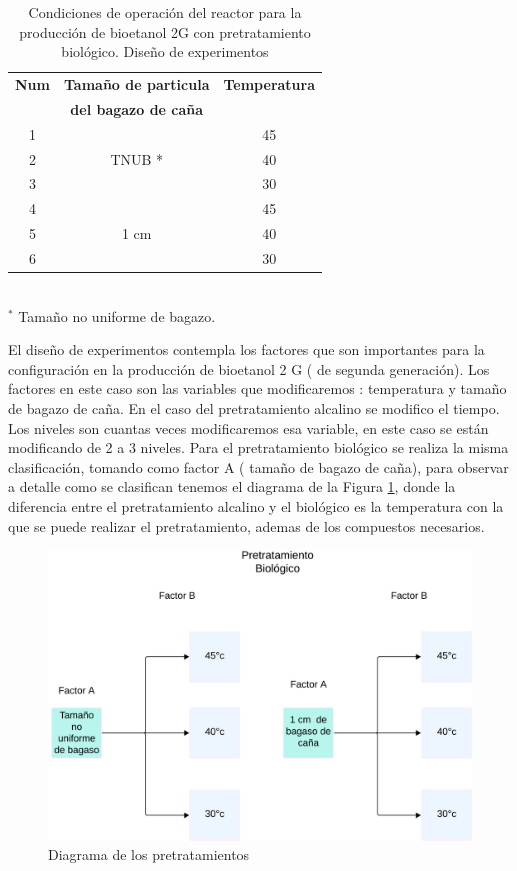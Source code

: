 \documentclass[12pt]{article}
\begin{document}
		
		
		
		

\begin{table}[H]
	\centering
	\caption{Condiciones de operación del reactor para la producción de bioetanol 2G con pretratamiento biológico. Diseño de experimentos}
	\label{biologico2}
		\begin{tabular}{|c|c|c|  }
			\hline
			\textbf{Num} & \textbf{Tamaño de particula } & \textbf{Temperatura} \\
			& \textbf{ del bagazo de caña} &     \\		
			\hline
			1   & \multirow{3}{*}{TNUB *} & 45  \\	\cline{1-1}	
			2 &  & 40 \\ \cline{1-1} 						
			3 &  & 30 \\ \cline{1-3}			
			4 &\multirow{3}{*}{1 cm} & 45    \\\cline{1-1}			
			5 &  & 40   \\  \cline{1-1}				
			6 &  & 30     \\  \cline{1-1}		
			\hline
		\end{tabular}
	\\[3pt] %
	\footnotesize{$^{*}$  Tamaño no uniforme de bagazo.}
	
\end{table}
		
		El diseño de experimentos contempla los factores que son importantes para la configuración en la producción de bioetanol 2 G ( de segunda generación). Los factores en este caso son las variables que modificaremos : temperatura y tamaño de bagazo de caña. En el caso del pretratamiento alcalino se modifico el tiempo.
		Los niveles son cuantas veces modificaremos esa variable, en este caso se están modificando de 2 a 3 niveles.
		Para el pretratamiento biológico se realiza la misma clasificación, tomando como factor A ( tamaño de bagazo de caña), para observar a detalle como se clasifican tenemos el diagrama de la Figura \ref{Diagrama biologico}, donde la diferencia entre el pretratamiento alcalino y el biológico es la temperatura con la que se puede realizar el pretratamiento, ademas de los compuestos necesarios.
		
		\begin{figure} [h!]
			\centering
			\includegraphics[width=0.7\linewidth]{imagenes/diagrama biologico}
			\caption{Diagrama de los pretratamientos}
			\label{Diagrama biologico}
		\end{figure}
		
\end{document}
